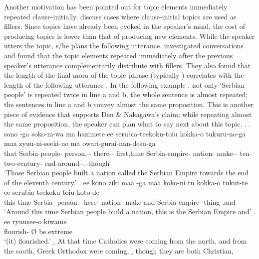 Another motivation has been pointed out for topic elements immediately repeated clause-initially.
 discuss cases where clause-initial topics are used as fillers.
Since topics have already been evoked in the speaker's mind, the cost of producing topics is lower than that of producing new elements.
While the speaker utters the topic,
s/he plans the following utterance.
 investigated conversations and found that the topic elements repeated immediately after the previous speaker's utterance
complementarily distribute with fillers.
They also found that the length of the final mora of the topic phrase (typically ) correlates with the length of the following utterance
\cite[see also][]{watanabeden10}.
In the following example \Next,
not only `Serbian people' is repeated twice in line a and b,
the whole sentence is almost repeated;
the sentences in line a and b convey almost the same proposition.
This is another piece of evidence that supports Den \& Nakagawa's claim;
while repeating almost the same proposition,
the speaker can plan what to say next about this topic.
%
\ex.
 \ag. sono  -ga soko-ni-wa ma hazimete ee serubia-teekoku-toiu kokka-o tukuru-no-ga maa zyuu-ni-seeki-no ma owari-gurai-nan-desu-ga \\
 	that Serbia-people- person.-- there--  first.time  Serbia-empire- nation- make--  ten-two-century-  end-around--.-though \\
	`Those Serbian people built a nation called the Serbian Empire towards the end of the eleventh century.'
 \bg. ee kono ziki maa  -ga maa koko-ni tu kokka-o tukut-te ee serubia-teekoku-toiu koto-de \\
 	 this time  Serbia- person.-  here-  nation- make-and  Serbia-empire- thing-.and \\
	`Around this time Serbian people build a nation, this is the Serbian Empire and'
 \bg. ee ryuusee-o \EM{\O} kiwame \\
 		 flourish- {\O} be.extreme \\
	`(it) flourished.'
 \b. At that time Catholics were coming from the north, and from the south, Greek Orthodox were coming,
 \b. though they are both Christian,
